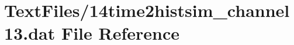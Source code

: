 \hypertarget{14time2histsim__channel13_8dat}{}\section{Text\+Files/14time2histsim\+\_\+channel13.dat File Reference}
\label{14time2histsim__channel13_8dat}
